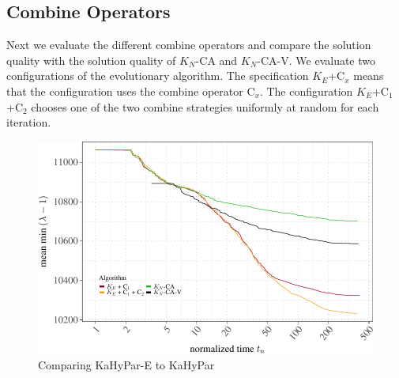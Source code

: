 \documentclass[a4paper,12pt,titlepage, BCOR7mm,headsepline]{scrbook}
\numberwithin{equation}{section}
\begin{document}
\subsection{Combine Operators}
\label{sec:combineoperatorevaluation}
Next we evaluate the different combine operators and compare the solution quality with the solution quality of $K_N$-CA and $K_N$-CA-V. We evaluate two configurations of the evolutionary algorithm. The specification $K_E$+C$_x$ means that the configuration uses the combine operator C$_x$. The configuration $K_E$+C$_1$+C$_2$ chooses one of the two combine strategies uniformly at random for each iteration.
\begin{figure}[H]

\begin{center}
\includegraphics{rnw/tuning_subset_plots/combine_plot-1}\caption{Comparing KaHyPar-E to KaHyPar}\label{fig:combineop}
\end{center} 

\end{figure}
\end{document}
